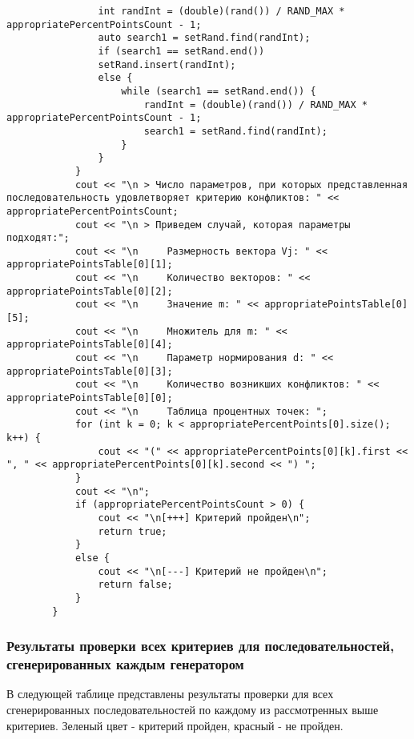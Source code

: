 \documentclass[bachelor, och, coursework]{shiza}
\begin{document}
\begin{verbatim}
				int randInt = (double)(rand()) / RAND_MAX * appropriatePercentPointsCount - 1;
				auto search1 = setRand.find(randInt);
				if (search1 == setRand.end())
				setRand.insert(randInt);
				else {
					while (search1 == setRand.end()) {
						randInt = (double)(rand()) / RAND_MAX * appropriatePercentPointsCount - 1;
						search1 = setRand.find(randInt);
					}
				}
			}
			cout << "\n > Число параметров, при которых представленная последовательность удовлетворяет критерию конфликтов: " << appropriatePercentPointsCount;
			cout << "\n > Приведем случай, которая параметры подходят:";
			cout << "\n     Размерность вектора Vj: " << appropriatePointsTable[0][1];
			cout << "\n     Количество векторов: " << appropriatePointsTable[0][2];
			cout << "\n     Значение m: " << appropriatePointsTable[0][5];
			cout << "\n     Множитель для m: " << appropriatePointsTable[0][4];
			cout << "\n     Параметр нормирования d: " << appropriatePointsTable[0][3];
			cout << "\n     Количество возникших конфликтов: " << appropriatePointsTable[0][0];
			cout << "\n     Таблица процентных точек: ";
			for (int k = 0; k < appropriatePercentPoints[0].size(); k++) {
				cout << "(" << appropriatePercentPoints[0][k].first << ", " << appropriatePercentPoints[0][k].second << ") ";
			}
			cout << "\n";
			if (appropriatePercentPointsCount > 0) {
				cout << "\n[+++] Критерий пройден\n";
				return true;
			}
			else {
				cout << "\n[---] Критерий не пройден\n";
				return false;
			}
		}
	\end{verbatim}
	
	\subsubsection{Результаты проверки всех критериев для последовательностей, сгенерированных каждым генератором}
	
	В следующей таблице представлены результаты проверки для всех сгенерированных последовательностей по каждому из рассмотренных выше критериев. Зеленый цвет - критерий пройден, красный - не пройден.
	
\end{document}
